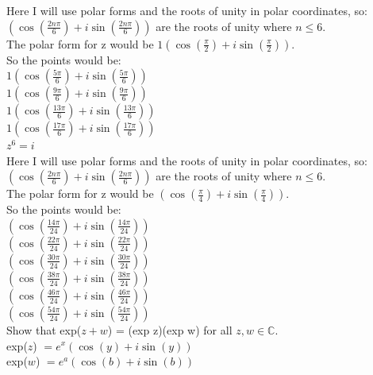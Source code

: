 \documentclass[12pt]{article}
\begin{document}
Here I will use polar forms and the roots of unity in polar coordinates, so:\\

$(\cos(\frac{2n\pi}{6}) + i\sin(\frac{2n\pi}{6}))$ are the roots of unity where $n \leq 6$.\\

The polar form for z would be $1(\cos(\frac{\pi}{2}) + i\sin(\frac{\pi}{2}))$.\\

So the points would be:\\


$1(\cos(\frac{5\pi}{6}) + i\sin(\frac{5\pi}{6}))$\\
$1(\cos(\frac{9\pi}{6}) + i\sin(\frac{9\pi}{6}))$\\
$1(\cos(\frac{13\pi}{6}) + i\sin(\frac{13\pi}{6}))$\\
$1(\cos(\frac{17\pi}{6}) + i\sin(\frac{17\pi}{6}))$\\


 $z^6 = i$\\

Here I will use polar forms and the roots of unity in polar coordinates, so:\\

$(\cos(\frac{2n\pi}{6}) + i\sin(\frac{2n\pi}{6}))$ are the roots of unity where $n \leq 6$.\\

The polar form for z would be $(\cos(\frac{\pi}{4}) + i\sin(\frac{\pi}{4}))$.\\

So the points would be:\\

$(\cos(\frac{14\pi}{24}) + i\sin(\frac{14\pi}{24}))$\\
$(\cos(\frac{22\pi}{24}) + i\sin(\frac{22\pi}{24}))$\\
$(\cos(\frac{30\pi}{24}) + i\sin(\frac{30\pi}{24}))$\\
$(\cos(\frac{38\pi}{24}) + i\sin(\frac{38\pi}{24}))$\\
$(\cos(\frac{46\pi}{24}) + i\sin(\frac{46\pi}{24}))$\\
$(\cos(\frac{54\pi}{24}) + i\sin(\frac{54\pi}{24}))$\\

 Show that exp($z+w$) = (exp z)(exp w) for all $z,w \in \mathbb{C}$.\\

exp($z$) $ = e^{x}(\cos(y)+i\sin(y))$\\
exp($w$) $ = e^{a}(\cos(b)+i\sin(b))$\\
\end{document}
